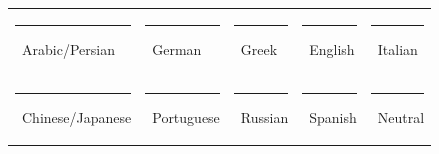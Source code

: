 \documentclass{article}
\begin{document}
\raggedright

\begin{tcolorbox}[colframe=gray!40,colback=white,
                  boxrule=0.5pt,arc=4pt,auto outer arc,
                  left=6pt,right=6pt,top=4pt,bottom=4pt]
\centering

\begin{tabular}{l l l l l}
    \textcolor{Arabic}{\rule{.9em}{.9em}}~Arabic/Persian & 
    \textcolor{German}{\rule{.9em}{.9em}}~German &
    \textcolor{Greek}{\rule{.9em}{.9em}}~Greek &
    \textcolor{English}{\rule{.9em}{.9em}}~English &
    \textcolor{Italian}{\rule{.9em}{.9em}}~Italian \\
    \textcolor{Chinese}{\rule{.9em}{.9em}}~Chinese/Japanese &
    \textcolor{Portuguese}{\rule{.9em}{.9em}}~Portuguese &
    \textcolor{Russian}{\rule{.9em}{.9em}}~Russian &
    \textcolor{Spanish}{\rule{.9em}{.9em}}~Spanish &
    \textcolor{Neutral}{\rule{.9em}{.9em}}~Neutral \\
\end{tabular}
\end{tcolorbox}
\end{document}

